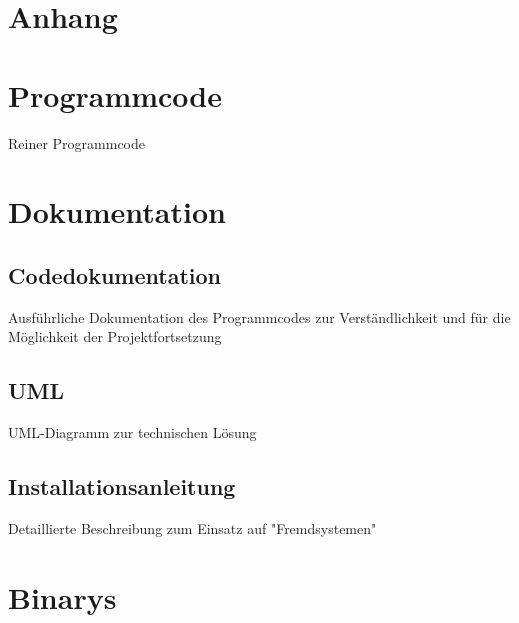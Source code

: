 \documentclass[12pt,a4paper,bibliography=totocnumbered,listof=totocnumbered]{scrartcl}
\begin{document}
\begin{appendix}
\section*{Anhang}
{}
\section{Programmcode}
Reiner Programmcode
\pagebreak
\section{Dokumentation}
\subsection{Codedokumentation}
Ausführliche Dokumentation des Programmcodes zur Verständlichkeit und für die Möglichkeit der Projektfortsetzung
\subsection{UML}
UML-Diagramm zur technischen Lösung
\pagebreak

\subsection{Installationsanleitung}
Detaillierte Beschreibung zum Einsatz auf "Fremdsystemen"
\pagebreak
\section{Binarys}
\end{appendix}
\end{document}

